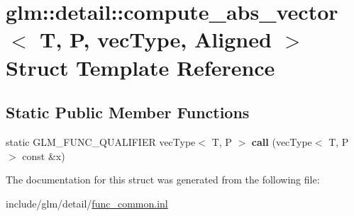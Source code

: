\hypertarget{structglm_1_1detail_1_1compute__abs__vector}{}\section{glm\+:\+:detail\+:\+:compute\+\_\+abs\+\_\+vector$<$ T, P, vec\+Type, Aligned $>$ Struct Template Reference}
\label{structglm_1_1detail_1_1compute__abs__vector}
\subsection*{Static Public Member Functions}
\begin{DoxyCompactItemize}
\item 
\mbox{\label{structglm_1_1detail_1_1compute__abs__vector_aec6dd5547933aa5379efb141041eba76}} 
static G\+L\+M\+\_\+\+F\+U\+N\+C\+\_\+\+Q\+U\+A\+L\+I\+F\+I\+ER vec\+Type$<$ T, P $>$ {\bfseries call} (vec\+Type$<$ T, P $>$ const \&x)
\end{DoxyCompactItemize}


The documentation for this struct was generated from the following file\+:\begin{DoxyCompactItemize}
\item 
include/glm/detail/\hyperlink{func__common_8inl}{func\+\_\+common.\+inl}\end{DoxyCompactItemize}
